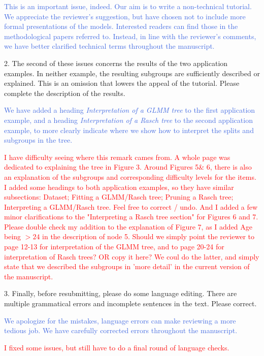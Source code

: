 \documentclass{letter}
\newcommand{\auth}[1]{\textcolor{RoyalBlue}{#1}}
\newcommand{\MF}[1]{\textcolor{red}{#1}}
\begin{document}
\auth{This is an important issue, indeed. Our aim is to write a non-technical tutorial. We appreciate the reviewer's suggestion, but have chosen not to include more formal presentations of the models. Interested readers can find those in the methodological papers referred to. Instead, in line with the reviewer's comments, we have better clarified technical terms throughout the manuscript.}



2. The second of these issues concerns the results of the two application examples. In neither example, the resulting subgroups are sufficiently described or explained. This is an omission that lowers the appeal of the tutorial. Please complete the description of the results.

\auth{We have added a heading \textit{Interpretation of a GLMM tree} to the first application example, and a heading \textit{Interpretation of a Rasch tree} to the second application example, to more clearly indicate where we show how to interpret the splits and subgroups in the tree. }

\MF{I have difficulty seeing where this remark cames from. A whole page was dedicated to explaining the tree in Figure 3. Around Figures 5\& 6, there is also an explanation of the subgroups and corresponding difficulty levels for the items. I added some headings to both application examples, so they have similar subsections: Dataset; Fitting a GLMM/Rasch tree; Pruning a Rasch tree; Interpreting a GLMM/Rasch tree. Feel free to correct / undo. And I added a few minor clarifications to the "Interpreting a Rasch tree section" for Figures 6 and 7. Please double check my addition to the explanation of Figure 7, as I added Age being $>24$ in the description of node 5. Should we simply point the reviewer to page 12-13 for interpretation of the GLMM tree, and to page 20-24 for interpretation of Rasch trees? OR copy it here? We coul do the latter, and simply state that we described the subgroups in 'more detail' in the current version of the manuscript.}


3. Finally, before resubmitting, please do some language editing. There are multiple grammatical errors and incomplete sentences in the text. Please correct.

\auth{We apologize for the mistakes, language errors can make reviewing a more tedious job. We have carefully corrected errors throughout the manuscript.}

\MF{I fixed some issues, but still have to do a final round of language checks.}
\end{document}
